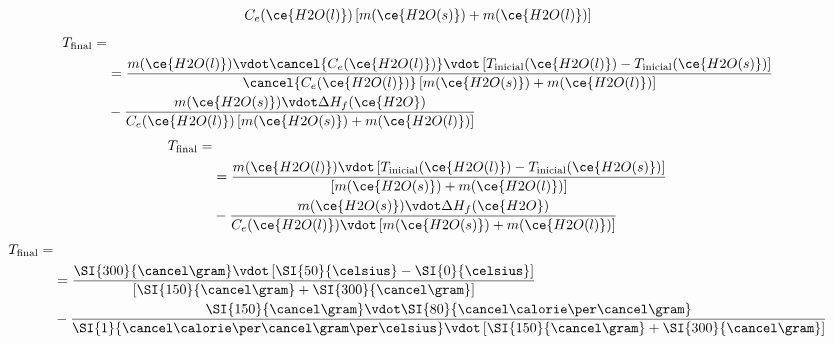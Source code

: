 \begin{frame}
{\begin{overprint}
\begin{align*}
{                        }{
                            C_e(\ce{H2O(l)})\left[m(\ce{H2O(s)}) + m(\ce{H2O(l)})\right]
                         }
                \end{align*}
                \begin{align*}
                    T_{\text{final}}=&\\
                    &=
                    \frac{
                        m(\ce{H2O(l)})\vdot \cancel{C_e(\ce{H2O(l)})}\vdot\left[T_{\text{inicial}}(\ce{H2O(l)})-T_{\text{inicial}}(\ce{H2O(s)})\right]
                    }{
                        \cancel{C_e(\ce{H2O(l)})}\left[m(\ce{H2O(s)}) + m(\ce{H2O(l)})\right]
                    }
                    \\
                    &-
                    \frac{
                        m(\ce{H2O(s)})\vdot\Delta H_f(\ce{H2O}) 
                    }{
                        C_e(\ce{H2O(l)})\left[m(\ce{H2O(s)}) + m(\ce{H2O(l)})\right]
                    }
                \end{align*}
                \begin{align*}
                    T_{\text{final}}=&\\
                    &=
                    \frac{
                        m(\ce{H2O(l)})\vdot\left[T_{\text{inicial}}(\ce{H2O(l)})-T_{\text{inicial}}(\ce{H2O(s)})\right]
                    }{
                        \left[m(\ce{H2O(s)}) + m(\ce{H2O(l)})\right]
                    }
                    \\
                    &-
                    \frac{
                        m(\ce{H2O(s)})\vdot\Delta H_f(\ce{H2O}) 
                    }{
                        C_e(\ce{H2O(l)})\vdot\left[m(\ce{H2O(s)}) + m(\ce{H2O(l)})\right]
                    }
                \end{align*}
                \begin{align*}
                    T_{\text{final}}=&\\
                    &=
                    \frac{
                        \SI{300}{\cancel\gram}\vdot\left[\SI{50}{\celsius}-\SI{0}{\celsius}\right]
                    }{
                        \left[\SI{150}{\cancel\gram} + \SI{300}{\cancel\gram}\right]
                    }
                    \\
                    &-
                    \frac{
                        \SI{150}{\cancel\gram}\vdot\SI{80}{\cancel\calorie\per\cancel\gram} 
                    }{
                        \SI{1}{\cancel\calorie\per\cancel\gram\per\celsius}\vdot\left[\SI{150}{\cancel\gram} + \SI{300}{\cancel\gram}\right]
                    }
                \end{align*}
        \end{overprint}
                }
\end{frame}

